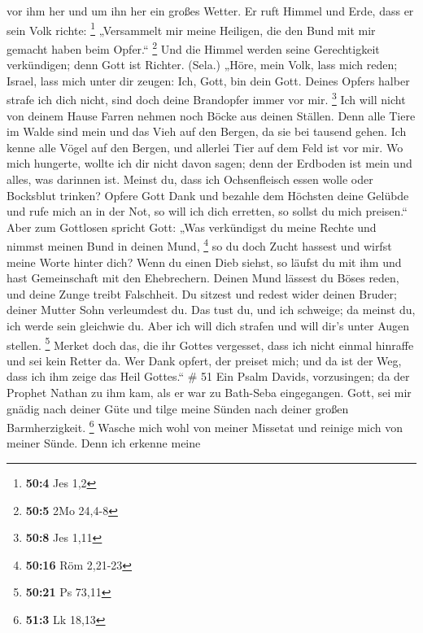 vor ihm her und um ihn her ein großes Wetter.  Er ruft
Himmel und Erde, dass er sein Volk richte: \footnote{\textbf{50:4} Jes
  1,2}  „Versammelt mir meine Heiligen, die den Bund mit
mir gemacht haben beim Opfer.`` \footnote{\textbf{50:5} 2Mo 24,4-8}
 Und die Himmel werden seine Gerechtigkeit verkündigen;
denn Gott ist Richter. (Sela.)  „Höre, mein Volk, lass
mich reden; Israel, lass mich unter dir zeugen: Ich, Gott, bin dein
Gott.  Deines Opfers halber strafe ich dich nicht, sind
doch deine Brandopfer immer vor mir. \footnote{\textbf{50:8} Jes 1,11}
 Ich will nicht von deinem Hause Farren nehmen noch Böcke
aus deinen Ställen.  Denn alle Tiere im Walde sind mein
und das Vieh auf den Bergen, da sie bei tausend gehen. 
Ich kenne alle Vögel auf den Bergen, und allerlei Tier auf dem Feld ist
vor mir.  Wo mich hungerte, wollte ich dir nicht davon
sagen; denn der Erdboden ist mein und alles, was darinnen ist.
 Meinst du, dass ich Ochsenfleisch essen wolle oder
Bocksblut trinken?  Opfere Gott Dank und bezahle dem
Höchsten deine Gelübde  und rufe mich an in der Not, so
will ich dich erretten, so sollst du mich preisen.`` 
Aber zum Gottlosen spricht Gott: „Was verkündigst du meine Rechte und
nimmst meinen Bund in deinen Mund, \footnote{\textbf{50:16} Röm 2,21-23}
 so du doch Zucht hassest und wirfst meine Worte hinter
dich?  Wenn du einen Dieb siehst, so läufst du mit ihm
und hast Gemeinschaft mit den Ehebrechern.  Deinen Mund
lässest du Böses reden, und deine Zunge treibt Falschheit.
 Du sitzest und redest wider deinen Bruder; deiner Mutter
Sohn verleumdest du.  Das tust du, und ich schweige; da
meinst du, ich werde sein gleichwie du. Aber ich will dich strafen und
will dir's unter Augen stellen. \footnote{\textbf{50:21} Ps 73,11}
 Merket doch das, die ihr Gottes vergesset, dass ich
nicht einmal hinraffe und sei kein Retter da.  Wer Dank
opfert, der preiset mich; und da ist der Weg, dass ich ihm zeige das
Heil Gottes.`` \# 51  Ein Psalm Davids, vorzusingen;
 da der Prophet Nathan zu ihm kam, als er war zu Bath-Seba
eingegangen.  Gott, sei mir gnädig nach deiner Güte und
tilge meine Sünden nach deiner großen Barmherzigkeit. \footnote{\textbf{51:3}
  Lk 18,13}  Wasche mich wohl von meiner Missetat und
reinige mich von meiner Sünde.  Denn ich erkenne meine

